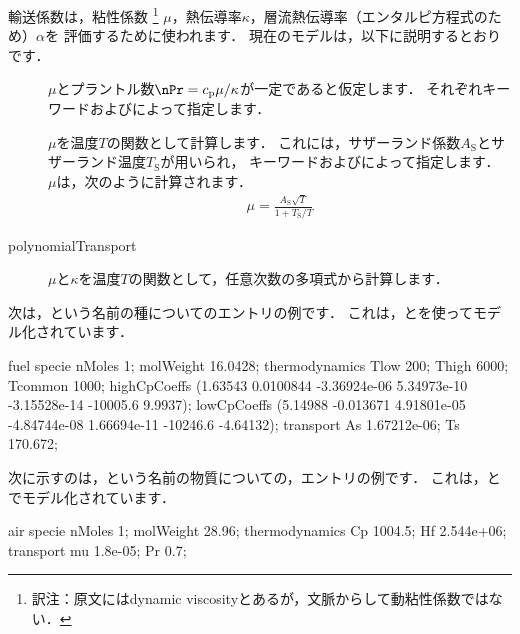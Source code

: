 輸送係数は，粘性係数%
\footnote{訳注：原文にはdynamic viscosityとあるが，文脈からして動粘性係数ではない．}%
$\mu$，熱伝導率$\kappa$，層流熱伝導率（エンタルピ方程式のため）$\alpha$を
評価するために使われます．
現在のモデルは，以下に説明するとおりです．
\begin{description}
 \item[]
            $\mu$とプラントル数$\nPr = c_{\mathrm{p}}\mu/\kappa$が一定であると仮定します．
            それぞれキーワードおよびによって指定します．
 \item[]
            $\mu$を温度$T$の関数として計算します．
            これには，サザーランド係数$A_{\mathrm{S}}$とサザーランド温度$T_{\mathrm{S}}$が用いられ，
            キーワードおよびによって指定します．
            $\mu$は，次のように計算されます．
\begin{align}
 \label{eq:7.2}
 \mu = \frac{A_{\mathrm{S}}\sqrt{T}}{1 + T_{\mathrm{S}}/T}
\end{align}
 \item[polynomialTransport]
            $\mu$と$\kappa$を温度$T$の関数として，任意次数の多項式から計算します．
\end{description}
次は，という名前の種についてのエントリの例です．
これは，とを使ってモデル化されています．
\begin{OFverbatim}[file]
fuel
{
    specie
    {
        nMoles       1;
        molWeight    16.0428;
    }
    thermodynamics
    {
        Tlow         200;
        Thigh        6000;
        Tcommon      1000;
        highCpCoeffs (1.63543 0.0100844 -3.36924e-06 5.34973e-10
                      -3.15528e-14 -10005.6 9.9937);
        lowCpCoeffs  (5.14988 -0.013671 4.91801e-05 -4.84744e-08
                      1.66694e-11 -10246.6 -4.64132);
    }
    transport
    {
        As           1.67212e-06;
        Ts           170.672;
    }
}
\end{OFverbatim}
次に示すのは，という名前の物質についての，エントリの例です．
これは，とでモデル化されています．
\begin{OFverbatim}[file]
air
{
    specie
    {
        nMoles          1;
        molWeight       28.96;
    }
    thermodynamics
    {
        Cp              1004.5;
        Hf              2.544e+06;
    }
    transport
    {
        mu              1.8e-05;
        Pr              0.7;
    }
}
\end{OFverbatim}



